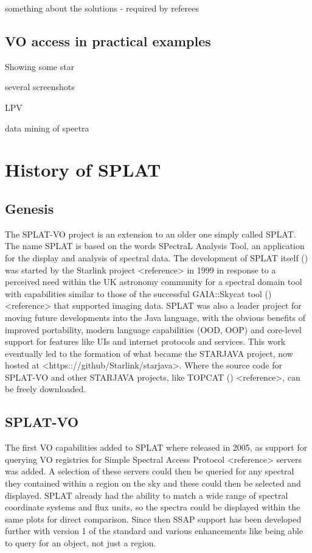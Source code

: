 \documentclass[final,authoryear,5p,times,twocolumn]{elsarticle}
\begin{document}
something about the solutions - required by referees





\subsection{VO access in practical examples}


Showing some star 

several screenshots

LPV

data mining of spectra




\section{History of SPLAT}
\subsection{Genesis}

The SPLAT-VO project is an extension to an older one simply called SPLAT. The
name SPLAT is based on the words SPectraL Analysis Tool, an application for
the display and analysis of spectral data. The development of SPLAT
itself () was
started by the Starlink project <reference> in 1999 in response to a perceived
need within the UK astronomy community for a spectral domain tool with
capabilities similar to those of the successful GAIA::Skycat tool
() <reference>
that supported imaging data. SPLAT was also a leader project for moving future
developments into the Java language, with the obvious benefits of improved
portability, modern language capabilities (OOD, OOP) and core-level support for
features like UIs and internet protocols and services. This work eventually
led to the formation of what became the STARJAVA project, now hosted at
<https:://github/Starlink/starjava>. Where the source code for SPLAT-VO and
other STARJAVA projects, like TOPCAT () <reference>, can be freely downloaded.

\subsection{SPLAT-VO}
The first VO capabilities added to SPLAT where released in 2005, as support
for querying VO registries for Simple Spectral Access Protocol <reference>
servers was added. A selection of these servers could then be queried for any
spectral they contained within a region on the sky and these could then be
selected and displayed. SPLAT already had the ability to match a wide range of
spectral coordinate systems and flux units, so the spectra could be displayed
within the same plots for direct comparison. Since then SSAP support has been
developed further with version 1 of the standard and various enhancements like
being able to query for an object, not just a region.
\end{document}
